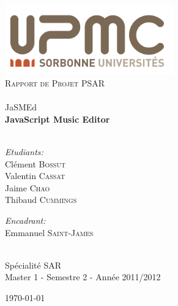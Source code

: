 \begin{titlepage}

\begin{center}

\includegraphics[height=3cm]{./logo_upmc.png}\\[2cm]

\textsc{\LARGE Rapport de Projet PSAR}\\[1.5cm]

\HRule \\[0.4cm]
{\huge JaSMEd}\\[0.4cm]
{\huge \bfseries JavaScript Music Editor}\\[0.4cm]
\HRule \\[1.5cm]

\begin{minipage}{0.4\textwidth}
\begin{flushleft} \large
\emph{Etudiants:}\\
Clément \textsc{Bossut}\\
Valentin \textsc{Cassat}\\
Jaime \textsc{Chao}\\
Thibaud \textsc{Cummings}\\
\end{flushleft}
\end{minipage}
\begin{minipage}{0.4\textwidth}
\begin{flushright} \large
\emph{Encadrant:}\\
Emmanuel \textsc{Saint-James}\\
\end{flushright}
\end{minipage}\\[4cm]

\large
Spécialité SAR\\
Master 1 - Semestre 2 - Année 2011/2012

\vfill

{\large \today}

\end{center}

\end{titlepage}
